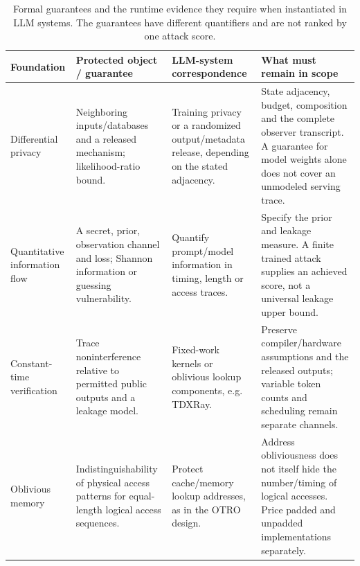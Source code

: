 \begin{table}[t]\centering\footnotesize
\caption{Formal guarantees and the runtime evidence they require when instantiated in LLM systems. The guarantees have different quantifiers and are not ranked by one attack score.}\label{tab:r33-formal}
\begin{tabularx}{\textwidth}{@{}p{}YYY@{}}\toprule
Foundation & Protected object / guarantee & LLM-system correspondence & What must remain in scope\\\midrule
Differential privacy \cite{dwork2014foundations} & Neighboring inputs/databases and a released mechanism; likelihood-ratio bound. & Training privacy or a randomized output/metadata release, depending on the stated adjacency. & State adjacency, budget, composition and the complete observer transcript. A guarantee for model weights alone does not cover an unmodeled serving trace.\\
Quantitative information flow \cite{smith2009qif} & A secret, prior, observation channel and loss; Shannon information or guessing vulnerability. & Quantify prompt/model information in timing, length or access traces. & Specify the prior and leakage measure. A finite trained attack supplies an achieved score, not a universal leakage upper bound.\\
Constant-time verification \cite{almeida2016constanttime} & Trace noninterference relative to permitted public outputs and a leakage model. & Fixed-work kernels or oblivious lookup components, e.g. TDXRay. & Preserve compiler/hardware assumptions and the released outputs; variable token counts and scheduling remain separate channels.\\
Oblivious memory \cite{stefanov2013pathoram} & Indistinguishability of physical access patterns for equal-length logical access sequences. & Protect cache/memory lookup addresses, as in the OTRO design. & Address obliviousness does not itself hide the number/timing of logical accesses. Price padded and unpadded implementations separately.\\
\bottomrule\end{tabularx}\end{table}
